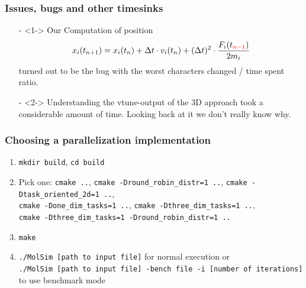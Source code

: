 \begin{frame}
	\frametitle{Issues, bugs and other timesinks}
	\large
	\begin{itemize}
		\setlength\itemsep{1em}
		\item[-]<1-> 	Our Computation of position
		\begin{equation}
			x_i(t_{n+1}) = x_i(t_n) + \Delta t \cdot v_i(t_n) + (\Delta t)^2 \cdot \frac{F_i(t_{\textcolor{red}{n-1}})}{2m_i}
		\end{equation}
		turned out to be the bug with the worst characters changed / time spent ratio.
		\item[-]<2-> Understanding the vtune-output of the 3D approach took a considerable amount of time. Looking back at it we don't really know why.
	\end{itemize}
	\pause
\end{frame}

\begin{frame}
	\PraesentationBildUhrenturm
\end{frame}



\begin{frame}
	\frametitle{Choosing a parallelization implementation}
	\large
	\begin{enumerate}
		
		\item \texttt{mkdir build}, \texttt{cd build} 
		\item Pick one: \texttt{cmake ..}, \texttt{cmake -Dround\_robin\_distr=1 ..}, \texttt{cmake -Dtask\_oriented\_2d=1 ..},\\ 
		\texttt{cmake -Done\_dim\_tasks=1 ..},   \texttt{cmake -Dthree\_dim\_tasks=1 ..},\\ 
		\texttt{cmake -Dthree\_dim\_tasks=1 -Dround\_robin\_distr=1 ..}
		
		\item \texttt{make}
		\item  \texttt{./MolSim [path to input file]} for normal execution or \\ \texttt{./MolSim [path to input file] -bench file -i [number of iterations]} to use benchmark mode 
	\end{enumerate}
\end{frame}

